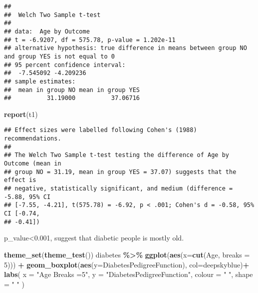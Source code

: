 \documentclass[
]{article}
\newenvironment{Shaded}{\begin{snugshade}}{\end{snugshade}}
\newcommand{\AttributeTok}[1]{\textcolor[rgb]{0.13,0.29,0.53}{#1}}
\newcommand{\DecValTok}[1]{\textcolor[rgb]{0.00,0.00,0.81}{#1}}
\newcommand{\FunctionTok}[1]{\textcolor[rgb]{0.13,0.29,0.53}{\textbf{#1}}}
\newcommand{\NormalTok}[1]{#1}
\newcommand{\SpecialCharTok}[1]{\textcolor[rgb]{0.81,0.36,0.00}{\textbf{#1}}}
\newcommand{\StringTok}[1]{\textcolor[rgb]{0.31,0.60,0.02}{#1}}
\begin{document}
\begin{verbatim}
## 
##  Welch Two Sample t-test
## 
## data:  Age by Outcome
## t = -6.9207, df = 575.78, p-value = 1.202e-11
## alternative hypothesis: true difference in means between group NO and group YES is not equal to 0
## 95 percent confidence interval:
##  -7.545092 -4.209236
## sample estimates:
##  mean in group NO mean in group YES 
##          31.19000          37.06716
\end{verbatim}

\begin{Shaded}
\begin{Highlighting}[]
\FunctionTok{report}\NormalTok{(t1)}
\end{Highlighting}
\end{Shaded}

\begin{verbatim}
## Effect sizes were labelled following Cohen's (1988) recommendations.
## 
## The Welch Two Sample t-test testing the difference of Age by Outcome (mean in
## group NO = 31.19, mean in group YES = 37.07) suggests that the effect is
## negative, statistically significant, and medium (difference = -5.88, 95% CI
## [-7.55, -4.21], t(575.78) = -6.92, p < .001; Cohen's d = -0.58, 95% CI [-0.74,
## -0.41])
\end{verbatim}

p\_value\textless0.001, suggest that diabetic people is mostly old.

\begin{Shaded}
\begin{Highlighting}[]
\FunctionTok{theme\_set}\NormalTok{(}\FunctionTok{theme\_test}\NormalTok{())}
\NormalTok{diabetes }\SpecialCharTok{\%\textgreater{}\%} 
  \FunctionTok{ggplot}\NormalTok{(}\FunctionTok{aes}\NormalTok{(}\AttributeTok{x=}\FunctionTok{cut}\NormalTok{(Age, }\AttributeTok{breaks =} \DecValTok{5}\NormalTok{))) }\SpecialCharTok{+}
        \FunctionTok{geom\_boxplot}\NormalTok{(}\FunctionTok{aes}\NormalTok{(}\AttributeTok{y=}\NormalTok{DiabetesPedigreeFunction), }\AttributeTok{col=}\StringTok{\textquotesingle{}deepskyblue\textquotesingle{}}\NormalTok{)}\SpecialCharTok{+}
  \FunctionTok{labs}\NormalTok{(}
    \AttributeTok{x =} \StringTok{"Age Breaks =5"}\NormalTok{,}
    \AttributeTok{y =} \StringTok{"DiabetesPedigreeFunction"}\NormalTok{,}
    \AttributeTok{colour =} \StringTok{" "}\NormalTok{,}
    \AttributeTok{shape =} \StringTok{" "}
\NormalTok{   ) }
\end{Highlighting}
\end{Shaded}
\end{document}
